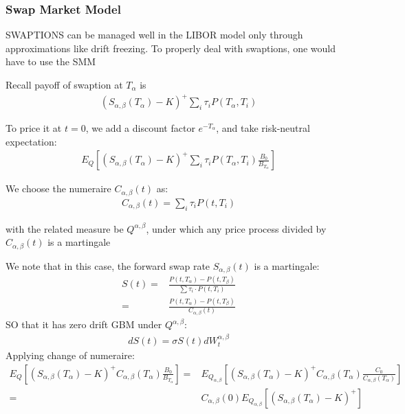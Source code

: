 \subsubsection{Swap Market Model}
SWAPTIONS can be managed well in the LIBOR model only through
approximations like drift freezing. To properly deal with swaptions, one
would have to use the SMM

Recall payoff of swaption at $T_\alpha$ is
\begin{align*}
    (S_{\alpha, \beta} (T_\alpha) - K )^+ \sum_i \tau_i P(T_\alpha, T_i)
\end{align*}

To price it at $ t= 0 $, we add a discount factor $e^{-T_\alpha}$, 
and take risk-neutral expectation:
\begin{align*}
    E_Q \left[ (S_{\alpha, \beta} (T_\alpha) - K )^+ \sum_i \tau_i P(T_\alpha, T_i) 
    \frac{B_0}{B_{T_\alpha}} \right]
\end{align*}

We choose the numeraire $ C_{\alpha, \beta} (t) $ as:
\begin{align*}
    C_{\alpha, \beta} (t) = \sum_i \tau_i P(t, T_i)
\end{align*}

with the related measure be $ Q^{\alpha, \beta}$, under which
any price process divided by $ C_{\alpha, \beta} (t) $ is a martingale

We note that in this case, the forward swap rate
$  S_{\alpha, \beta} (t) $ is a martingale:
\begin{align*}
    S(t) =& \frac{P(t, T_{\alpha}) - P(t, T_{\beta})}{\sum \tau_i \cdot P(t, T_i)}\\
    =& \frac{P(t, T_{\alpha}) - P(t, T_{\beta})}{C_{\alpha, \beta} (t)}
\end{align*}
SO that it has zero drift GBM under $ Q^{\alpha, \beta}$:
\begin{align*}
    dS(t) = \sigma S(t) dW_t^{\alpha, \beta}
\end{align*}
Applying change of numeraire:
\begin{align*}
    E_Q \left[ (S_{\alpha, \beta} (T_\alpha) - K )^+ C_{\alpha, \beta} (T_\alpha) 
    \frac{B_0}{B_{T_\alpha}} \right] 
    =& E_{Q_{\alpha, \beta}} \left[ (S_{\alpha, \beta} (T_\alpha) - K )^+ C_{\alpha, \beta} (T_\alpha) 
    \frac{C_0}{C_{\alpha, \beta} (T_\alpha)} \right]\\
    =& C_{\alpha, \beta} (0) E_{Q_{\alpha, \beta}} \left[ (S_{\alpha, \beta} (T_\alpha) - K )^+ \right]
\end{align*}

